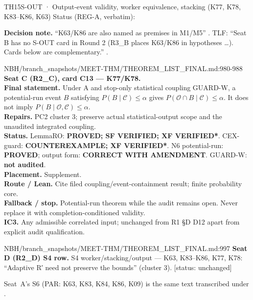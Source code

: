 \begin{card}{TH15}{S-OUT · Output-event validity, worker equivalence, stacking (K77, K78, K83–K86, K63)}
\approvedFB\quad Status (REG-A, verbatim):  

\textbf{Decision note.} ``K63/K86 are also named as premises in M1/M5'' . TLF: ``Seat B has no S-OUT card in Round 2 (R3\_B places K63/K86 in hypotheses \ldots). Cards below are complementary.'' .

\begin{stmt}{NBH/branch_snapshots/MEET-THM/THEOREM_LIST_FINAL.md:980-988}
\textbf{Seat C (R2\_C), card C13 — K77/K78.}\\
\textbf{Final statement.} Under A and stop-only statistical coupling GUARD-W, a potential-run event $B$ satisfying $P(B\mid\mathcal C)\le\alpha$ gives $P(\mathcal O\cap B\mid\mathcal C)\le\alpha$. It does not imply $P(B\mid\mathcal O,\mathcal C)\le\alpha$.\\
\textbf{Repairs.} PC2 cluster 3; preserve actual statistical-output scope and the unaudited integrated coupling.\\
\textbf{Status.} LemmaRO: \textbf{PROVED; SF VERIFIED; XF VERIFIED*}. CEX-guard: \textbf{COUNTEREXAMPLE; XF VERIFIED*}. N6 potential-run: \textbf{PROVED}; output form: \textbf{CORRECT WITH AMENDMENT}. GUARD-W: \textbf{not audited}.\\
\textbf{Placement.} Supplement.\\
\textbf{Route / Lean.} Cite filed coupling/event-containment result; finite probability core.\\
\textbf{Fallback / stop.} Potential-run theorem while the audit remains open. Never replace it with completion-conditioned validity.\\
\textbf{IC3.} Any admissible correlated input; unchanged from R1 §D D12 apart from explicit audit qualification.
\end{stmt}

\begin{stmt}{NBH/branch_snapshots/MEET-THM/THEOREM_LIST_FINAL.md:997}
\textbf{Seat D (R2\_D) S4 row.} S4 worker/stacking/output — K63, K83–K86, K77, K78: ``Adaptive R′ need not preserve the bounds'' (cluster 3). [status: unchanged]
\end{stmt}
Seat~A's S6 (PAR: K63, K83, K84, K86, K09) is the same text transcribed under  .


\end{card}
